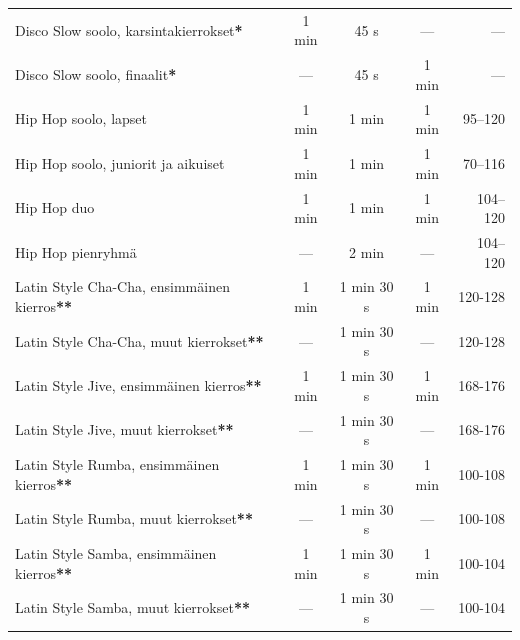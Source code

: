 \documentclass[12pt, a4paper, oneside]{article}
\begin{document}
\begin{table}[h!]
\begin{tabular}{@{\hspace{0.25cm}}lcccr@{\hspace{0.25cm}}}
        Disco Slow soolo, karsintakierrokset\textbf{*}      & 1 min               & 45 s                 & ---                    & ---            \\
        Disco Slow soolo, finaalit\textbf{*}                & ---                 & 45 s                 & 1 min                  & ---            \\ \midrule
        Hip Hop soolo, lapset                               & 1 min               & 1 min                & 1 min                  & 95–120         \\
        Hip Hop soolo, juniorit ja aikuiset                 & 1 min               & 1 min                & 1 min                  & 70–116         \\
        Hip Hop duo                                         & 1 min               & 1 min                & 1 min                  & 104–120        \\
        Hip Hop pienryhmä                                   & ---                 & 2 min                & ---                    & 104–120        \\ \midrule
        Latin Style Cha-Cha, ensimmäinen kierros\textbf{**} & 1 min               & 1 min 30 s           & 1 min                  & 120-128        \\
        Latin Style Cha-Cha, muut kierrokset\textbf{**}     & ---                 & 1 min 30 s           & ---                    & 120-128        \\
        Latin Style Jive, ensimmäinen kierros\textbf{**}    & 1 min               & 1 min 30 s           & 1 min                  & 168-176        \\
        Latin Style Jive, muut kierrokset\textbf{**}        & ---                 & 1 min 30 s           & ---                    & 168-176        \\
        Latin Style Rumba, ensimmäinen kierros\textbf{**}   & 1 min               & 1 min 30 s           & 1 min                  & 100-108        \\
        Latin Style Rumba, muut kierrokset\textbf{**}       & ---                 & 1 min 30 s           & ---                    & 100-108        \\
        Latin Style Samba, ensimmäinen kierros\textbf{**}   & 1 min               & 1 min 30 s           & 1 min                  & 100-104        \\
        Latin Style Samba, muut kierrokset\textbf{**}       & ---                 & 1 min 30 s           & ---                    & 100-104        \\ \bottomrule
    \end{tabular}
\end{table}
\end{document}
